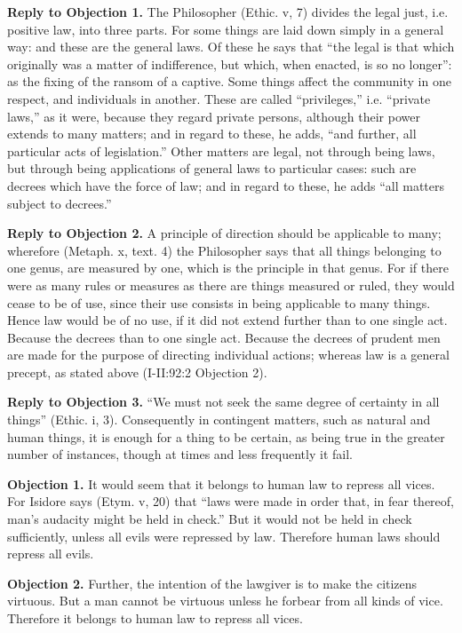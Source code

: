 \textbf{Reply to Objection 1.} The Philosopher (Ethic. v, 7) divides the legal just, i.e. positive law, into three parts. For some things are laid down simply in a general way: and these are the general laws. Of these he says that ``the legal is that which originally was a matter of indifference, but which, when enacted, is so no longer'': as the fixing of the ransom of a captive. Some things affect the community in one respect, and individuals in another. These are called ``privileges,'' i.e. ``private laws,'' as it were, because they regard private persons, although their power extends to many matters; and in regard to these, he adds, ``and further, all particular acts of legislation.'' Other matters are legal, not through being laws, but through being applications of general laws to particular cases: such are decrees which have the force of law; and in regard to these, he adds ``all matters subject to decrees.''

\textbf{Reply to Objection 2.} A principle of direction should be applicable to many; wherefore (Metaph. x, text. 4) the Philosopher says that all things belonging to one genus, are measured by one, which is the principle in that genus. For if there were as many rules or measures as there are things measured or ruled, they would cease to be of use, since their use consists in being applicable to many things. Hence law would be of no use, if it did not extend further than to one single act. Because the decrees than to one single act. Because the decrees of prudent men are made for the purpose of directing individual actions; whereas law is a general precept, as stated above (I-II:92:2 Objection 2).

\textbf{Reply to Objection 3.} ``We must not seek the same degree of certainty in all things'' (Ethic. i, 3). Consequently in contingent matters, such as natural and human things, it is enough for a thing to be certain, as being true in the greater number of instances, though at times and less frequently it fail.


\textbf{Objection 1.} It would seem that it belongs to human law to repress all vices. For Isidore says (Etym. v, 20) that ``laws were made in order that, in fear thereof, man's audacity might be held in check.'' But it would not be held in check sufficiently, unless all evils were repressed by law. Therefore human laws should repress all evils.

\textbf{Objection 2.} Further, the intention of the lawgiver is to make the citizens virtuous. But a man cannot be virtuous unless he forbear from all kinds of vice. Therefore it belongs to human law to repress all vices.

